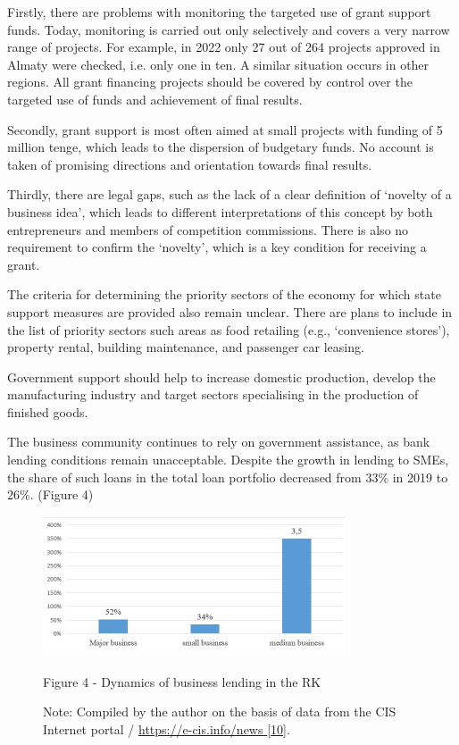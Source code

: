 \begin{multicols}{2}
Firstly, there are problems with monitoring the targeted use of grant
support funds. Today, monitoring is carried out only selectively and
covers a very narrow range of projects. For example, in 2022 only 27 out
of 264 projects approved in Almaty were checked, i.e. only one in ten. A
similar situation occurs in other regions. All grant financing projects
should be covered by control over the targeted use of funds and
achievement of final results.

Secondly, grant support is most often aimed at small projects with
funding of 5 million tenge, which leads to the dispersion of budgetary
funds. No account is taken of promising directions and orientation
towards final results.

Thirdly, there are legal gaps, such as the lack of a clear definition of
`novelty of a business idea', which leads to different interpretations
of this concept by both entrepreneurs and members of competition
commissions. There is also no requirement to confirm the `novelty',
which is a key condition for receiving a grant.

The criteria for determining the priority sectors of the economy for
which state support measures are provided also remain unclear. There are
plans to include in the list of priority sectors such areas as food
retailing (e.g., `convenience stores'), property rental, building
maintenance, and passenger car leasing.

Government support should help to increase domestic production, develop
the manufacturing industry and target sectors specialising in the
production of finished goods.

The business community continues to rely on government assistance, as
bank lending conditions remain unacceptable. Despite the growth in
lending to SMEs, the share of such loans in the total loan portfolio
decreased from 33\% in 2019 to 26\%. (Figure 4)
\end{multicols}


\begin{figure}[H]
	\centering
	\includegraphics[width=0.8\textwidth]{media/ekon/image2.3}
	\caption*{Figure 4 - Dynamics of business lending in the RK}
	\caption*{Note: Compiled by the author on the basis of data from the CIS
  Internet portal /
  \href{https://e-cis.info/news\%20\%5b10}{https://e-cis.info/news
  {[}10}{]}.}
\end{figure}


